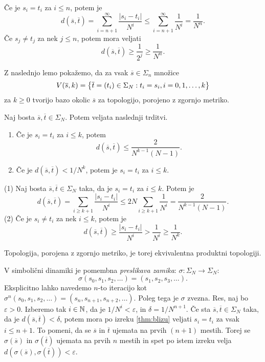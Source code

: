 \begin{dokaz}
    Če je \(s_i = t_i\) za \(i \leq n\), potem je
    \[d(\overline{s}, \overline{t}) = \sum_{i = n + 1}^{\infty} \frac{|s_i - t_i|}{N^i} \leq \sum_{i = n + 1}^{\infty} \frac{1}{N^i} = \frac{1}{N^n}.\]
    Če \(s_j \neq t_j\) za nek \(j \leq n\), potem mora veljati
    \[d(\overline{s}, \overline{t}) \geq \frac{1}{2^j} \geq \frac{1}{N^n}.\]
\end{dokaz}

Z naslednjo lemo pokažemo, da za vsak \(\overline{s} \in \Sigma_n\) množice
\[V(\overline{s}, k) = \left\{ \overline{t} = (t_i) \in \Sigma_N : t_i = s_i, i = 0, 1, \dots, k \right\}\]
za \(k \geq 0\) tvorijo bazo okolic \(\overline{s}\) za topologijo, porojeno z zgornjo metriko.

\begin{lema} \label{lem:seq-metric}
    Naj bosta \(\overline{s}, \overline{t} \in \Sigma_N\). Potem veljata naslednji trditvi.
    \begin{enumerate}[label=(\arabic*)]
        \item Če je \(s_i = t_i\) za \(i \leq k\), potem \[d (\overline{s}, \overline{t}) \leq \frac{2}{N^{k - 1} (N - 1)}.\]
        \item Če je \(d (\overline{s}, \overline{t}) < 1 / N^k\), potem je \(s_i = t_i\) za \(i \leq k\).
    \end{enumerate}
\end{lema}

\begin{dokaz}
    (1) Naj bosta \(\overline{s}, \overline{t} \in \Sigma_N\) taka, da je \(s_i = t_i\) za \(i \leq k\). Potem je
    \[d (\overline{s}, \overline{t}) = \sum_{i \geq k + 1} \frac{|s_i - t_i|}{N^i} \leq 2 N \sum_{i \geq k + 1} \frac{1}{N^i} = \frac{2}{N^{k - 1} (N - 1)}.\]
    (2) Če je \(s_i \neq t_i\) za nek \(i \leq k\), potem je
    \[d (\overline{s}, \overline{t}) \geq \frac{|s_i - t_i|}{N^i} > \frac{1}{N^i} \geq \frac{1}{N^k}.\]
\end{dokaz}

\noindent Topologija, porojena z zgornjo metriko, je torej ekvivalentna produktni topologiji.

V simbolični dinamiki je pomembna \emph{preslikava zamika}: \(\sigma \colon \Sigma_N \to \Sigma_N\):
\[\sigma (s_0, s_1, s_2, \dots) = (s_1, s_2, s_3, \dots).\]
Eksplicitno lahko navedemo \(n\)-to iteracijo kot \(\sigma^n (s_0, s_1, s_2, \dots) = (s_n, s_{n + 1}, s_{n + 2}, \dots)\). Poleg tega je \(\sigma\) zvezna. Res, naj bo \(\varepsilon > 0\). Izberemo tak \(i \in \mathbb N\), da je \(1 / N^i < \varepsilon\), in \(\delta = 1 / N^{n + 1}\). Če sta \(\overline{s}, \overline{t} \in \Sigma_N\) taka, da je \(d(\overline{s}, \overline{t}) < \delta\), potem mora po izreku \ref{thm:blizu} veljati \(s_i = t_i\) za vsak \(i \leq n + 1\). To pomeni, da se \(\overline{s}\) in \(\overline{t}\) ujemata na prvih \((n + 1)\) mestih. Torej se \(\sigma (\overline{s})\) in \(\sigma (\overline{t})\) ujemata na prvih \(n\) mestih in spet po istem izreku velja \(d (\sigma (\overline{s}), \sigma (\overline{t})) < \varepsilon\).

